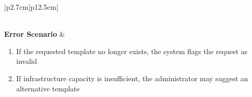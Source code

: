 \begin{table}[H]
\begin{tabular}{|p{2.7cm}|p{12.5cm}|}
\begin{minipage}[t]{\linewidth}
                                  \end{minipage}                            \\
        \hline
        \textbf{Error Scenario} & \begin{minipage}[t]{\linewidth}
                                      \begin{enumerate}[topsep=0pt,itemsep=1pt,parsep=0pt,partopsep=0pt]
                                          \item If the requested template no longer exists, the system flags the request as
                                                invalid
                                          \item If infrastructure capacity is insufficient, the administrator may suggest an
                                                alternative template
                                      \end{enumerate}
                                  \end{minipage}                               \\
        \hline
    \end{tabular}
    \label{tab:admin-approve-vm}
\end{table}
